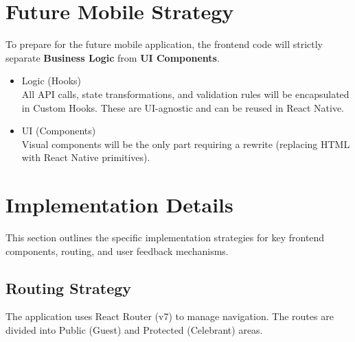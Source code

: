 \section{Future Mobile Strategy}
To prepare for the future mobile application, the frontend code will strictly separate \textbf{Business Logic} from \textbf{UI Components}.
\begin{itemize}
    \item Logic (Hooks) \\
        All API calls, state transformations, and validation rules will be encapsulated in Custom Hooks. These are UI-agnostic and can be reused in React Native.
    \item UI (Components) \\
        Visual components will be the only part requiring a rewrite (replacing HTML with React Native primitives).
\end{itemize}

\section{Implementation Details}
This section outlines the specific implementation strategies for key frontend components, routing, and user feedback mechanisms.

\subsection{Routing Strategy}
The application uses React Router (v7) to manage navigation. The routes are divided into Public (Guest) and Protected (Celebrant) areas.

